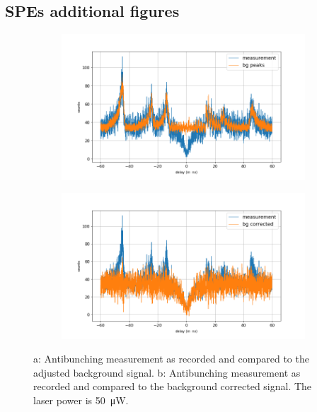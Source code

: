 \subsection{SPEs additional figures}
\label{sec:anhang:spe}

\begin{figure}[!ht]
    \centering
    \begin{subfigure}{0.47\textwidth}
        \centering
        \includegraphics[width=1.0\textwidth]{img/output_t2/50.0muW_bg_peaks.png}
    		\caption{}
    \end{subfigure}
    \begin{subfigure}{0.47\textwidth}
        \centering
        \includegraphics[width=\textwidth]{img/output_t2/50.0muW_bg_vgl.png}
        \caption{}
    \end{subfigure}
    \caption{a: Antibunching measurement as recorded and compared to the adjusted background signal. b: Antibunching measurement as recorded and compared to the background corrected signal. The laser power is \SI{50}{\micro W}.} %
\end{figure}
